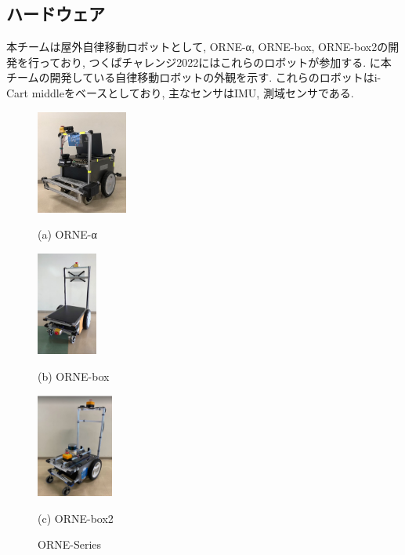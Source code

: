 \documentclass[uplatex, twocolumn, 9pt]{jsproceedings}
\begin{document}
\subsection{ハードウェア}
本チームは屋外自律移動ロボットとして, ORNE-α, ORNE-box, ORNE-box2の開発を行っており, つくばチャレンジ2022にはこれらのロボットが参加する. に本チームの開発している自律移動ロボットの外観を示す. これらのロボットはi-Cart middleをベースとしており, 主なセンサはIMU, 測域センサである. 

\begin{figure}[h]
  \centering
  \begin{minipage}[b]{0.3\linewidth}
    \centering
    \includegraphics[width=30mm]{fig/alpha.pdf}
    \caption*{(a) ORNE-α}
  \end{minipage} 
  \hspace{0.03\columnwidth}
  \begin{minipage}[b]{0.3\linewidth}
    \centering
    \includegraphics[height=34mm]{fig/box.pdf}
    \caption*{(b) ORNE-box}
  \end{minipage}
  \begin{minipage}[b]{0.3\linewidth}
    \centering
    \includegraphics[height=34mm]{fig/box2.pdf}
    \caption*{(c) ORNE-box2}
  \end{minipage}
  \caption{ORNE-Series}
  \label{fig:orne-series}%
\end{figure}
\end{document}
